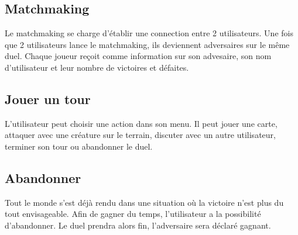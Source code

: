 \subsection{Matchmaking}
{Le matchmaking se charge d'établir une connection entre 2 utilisateurs. Une fois que 2 utilisateurs lance le matchmaking, ils deviennent adversaires sur le même duel. Chaque joueur reçoit comme information sur son advesaire, son nom d'utilisateur et leur nombre de victoires et défaites.}
\subsection{Jouer un tour}
{L'utilisateur peut choisir une action  dans son menu. Il peut jouer une carte, attaquer avec une créature sur le terrain, discuter avec un autre utilisateur, terminer son tour ou abandonner le duel.}
\subsection{Abandonner}
{Tout le monde s'est déjà rendu dans une situation où la victoire n'est plus du tout envisageable. Afin de gagner du temps, l'utilisateur a la possibilité d'abandonner. Le duel prendra alors fin, l'adversaire sera déclaré gagnant.}